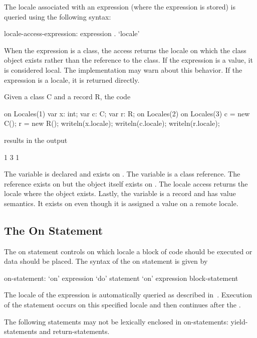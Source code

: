 The locale associated with an expression (where the expression is
stored) is queried using the following syntax:
\begin{syntax}
locale-access-expression:
  expression . `locale'
\end{syntax}
When the expression is a class, the access returns the locale on which
the class object exists rather than the reference to the class.  If
the expression is a value, it is considered local.  The implementation
may warn about this behavior.  If the expression is a locale, it is
returned directly.

\begin{example}
Given a class C and a record R, the code
\begin{chapel}
on Locales(1) {
  var x: int;
  var c: C;
  var r: R;
  on Locales(2) {
    on Locales(3) {
      c = new C();
      r = new R();
    }
    writeln(x.locale);
    writeln(c.locale);
    writeln(r.locale);
  }
}
\end{chapel}
results in the output
\begin{chapel}
1
3
1
\end{chapel}
The variable  is declared and exists on .
The variable  is a class reference.  The reference exists
on  but the object itself exists
on .  The locale access returns the locale where the
object exists.  Lastly, the variable  is a record and has
value semantics.  It exists on  even though it is
assigned a value on a remote locale.
\end{example}

\subsection{The On Statement}
\label{On}

The on statement controls on which locale a block of code should be
executed or data should be placed.  The syntax of the on statement is
given by
\begin{syntax}
on-statement:
  `on' expression `do' statement
  `on' expression block-statement
\end{syntax}
The locale of the expression is automatically queried as described
in~.  Execution of the
statement occurs on this specified locale and then continues after
the .

The following statements may not be lexically enclosed in
on-statements: yield-statements and return-statements.

